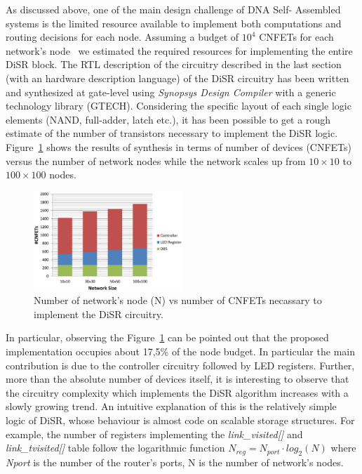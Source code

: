 As discussed above, one of the main design challenge of DNA Self-
Assembled systems is the limited resource available to implement both
computations and routing decisions for each node. Assuming a budget of
$10^4$ CNFETs for each network's node~\cite{liu_jetcs}  we estimated
the required resources for implementing the entire DiSR block. The RTL
description of the circuitry described in the last section (with an
hardware description language)  of the DiSR circuitry has been written
and synthesized at gate-level using \emph{Synopsys Design Compiler} with 
a generic technology library (GTECH).
Considering the specific layout of each single logic elements  (NAND,
full-adder, latch etc.), it has been possible to get a rough estimate
of the number of transistors necessary to implement the DiSR logic.
Figure~\ref{fig:synthesys} shows the results of synthesis in terms of
number of devices (CNFETs) versus the number of network nodes while
the network scales up from $10\times10$ to $100\times100$ nodes.

\begin{figure}
  \centering
  \includegraphics[width=0.50\textwidth]{pictures/synthesis.eps}
  \caption{Number of network's node (N) vs number of CNFETs necassary to implement
  the DiSR circuitry.}
 \label{fig:synthesys}
\end{figure}

In particular, observing the Figure~\ref{fig:synthesys} can  be
pointed out that the proposed implementation occupies about 17,5\% of
the node budget. In particular the main contribution is due to the
controller circuitry followed by LED registers. Further, more than the
absolute number of devices itself, it is interesting to observe that
the circuitry complexity which implements the DiSR algorithm increases
with a slowly growing trend.   An intuitive explanation of this is the
relatively simple logic of DiSR, whose behaviour is almost code on
scalable storage structures. For example, the number of registers
implementing the \emph{link\_visited[]} and \emph{link\_tvisited[]}
table follow the logarithmic function $N_{reg}=N_{port} \cdot
log_2(N)$ where \emph{Nport} is the number of the router’s ports, N is
the number of network’s nodes.

